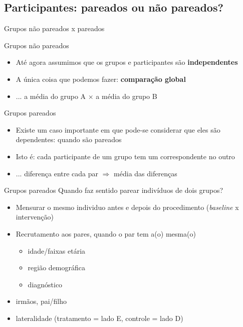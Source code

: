 \documentclass{beamer}
\begin{document}
\subsection{Participantes: pareados ou não pareados?}

\begin{frame}{\scriptsize Grupos não pareados x pareados}
  \begin{block}{Grupos não pareados}
    \begin{itemize}
      \footnotesize
    \item Até agora assumimos que os grupos e participantes são {\bf independentes}
    \item A única coisa que podemos fazer: {\bf comparação global}
    \item ... a média do grupo A $\times$ a média do grupo B
    \end{itemize}
  \end{block}
  \begin{block}{Grupos pareados}
    \begin{itemize}
      \footnotesize
    \item Existe um caso importante em que pode-se considerar que eles são dependentes: quando são pareados
    \item Isto é: cada participante de um grupo tem um correspondente no outro
    \item ... diferença entre cada par $\Rightarrow$ média das diferenças
    \end{itemize}
  \end{block}
\end{frame}

\begin{frame}{\scriptsize Grupos pareados}
  \scriptsize
Quando faz sentido parear indivíduos de dois grupos?
  \bigskip
  \begin{itemize}
    \scriptsize
  \item Mensurar o \alert{mesmo} individuo antes e depois do procedimento ({\em baseline} x intervenção)
    \medskip
  \item Recrutamento aos pares, quando o par tem a(o) mesma(o)
    \begin{itemize}
      \tiny
    \item idade/faixas etária
    \item região demográfica
    \item diagnóstico
    \end{itemize}
    \medskip
  \item irmãos, pai/filho
    \medskip
  \item lateralidade (tratamento = lado E, controle = lado D)
  \end{itemize}
\end{frame}
\end{document}
